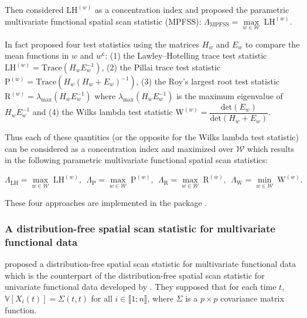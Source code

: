 \noindent Then \citet{notre_fonctionnel1} considered $\mathrm{LH}^{(w)}$ as a concentration index and proposed the parametric multivariate functional spatial scan statistic (MPFSS): $
\Lambda_{\text{MPFSS}} = \underset{w \in \mathcal{W}}{\max} \  \mathrm{LH}^{(w)}$.


\noindent In fact \citet{manovafonctional} proposed four test statistics using the matrices $H_w$ and $E_w$ to compare the mean functions in $w$ and $w^\mathsf{c}$:
(1) the Lawley–Hotelling trace test statistic $\text{LH}^{(w)} = \text{Trace}(H_w E_w^{-1})$, (2) the Pillai trace test statistic $\text{P}^{(w)} = \text{Trace}(H_w(H_w+E_w)^{-1})$, (3) the Roy's largest root test statistic $\text{R}^{(w)} = \lambda_{\text{max}}(H_w E_w^{-1})$ where $\lambda_{\text{max}}(H_w E_w^{-1})$ is the maximum eigenvalue of $H_w E_w^{-1}$ and (4) the Wilks lambda test statistic $\text{W}^{(w)} = \dfrac{\text{det}(E_w)}{\text{det}(H_w+E_w)}$.


\noindent Thus each of these quantities (or the opposite for the Wilks lambda test statistic) can be considered as a concentration index and maximized over $\mathcal{W}$ which results in the following parametric multivariate functional spatial scan statistics:

$$\Lambda_{\text{LH}} = \underset{w \in \mathcal{W}}{\max} \ \text{LH}^{(w)}, \ \ \Lambda_{\text{P}} = \underset{w \in \mathcal{W}}{\max} \ \text{P}^{(w)}, \ \ \Lambda_{\text{R}} = \underset{w \in \mathcal{W}}{\max} \ \text{R}^{(w)}, \ \ \Lambda_{\text{W}} = \underset{w \in \mathcal{W}}{\min} \ \text{W}^{(w)}. $$

\noindent These four approaches are implemented in the package .



\subsubsection{A distribution-free spatial scan statistic for multivariate functional data}


\citet{notre_fonctionnel1} proposed a distribution-free spatial scan statistic for multivariate functional data which is the counterpart of the distribution-free spatial scan statistic for univariate functional data developed by \citet{notre_fonctionnel}.
They supposed that for each time $t$, $\mathbb{V}[X_i(t)] = \Sigma(t,t)$ for all $i \in \llbracket 1 ; n \rrbracket$, where $\Sigma$ is a $p \times p$ covariance matrix function. \\

